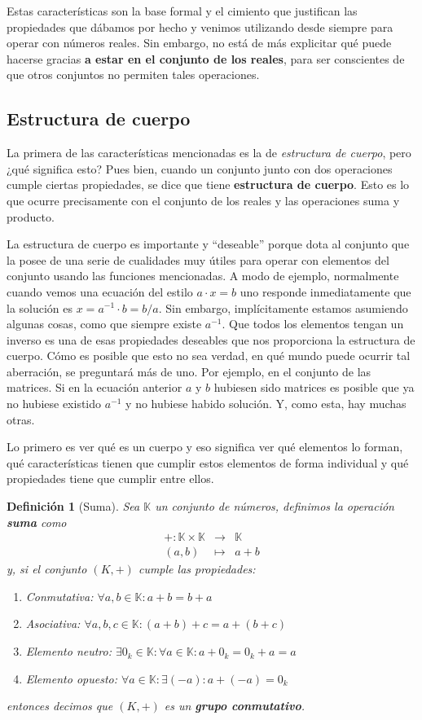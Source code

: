\documentclass[10pt,a4paper,openright]{book}
\theoremstyle{break}
\newtheorem{defi}{Definición}[chapter]
\begin{document}
Estas características son la base formal y el cimiento que justifican las propiedades que dábamos por hecho y venimos utilizando desde siempre para operar con números reales. Sin embargo, no está de más explicitar qué puede hacerse gracias \textbf{a estar en el conjunto de los reales}, para ser conscientes de que otros conjuntos no permiten tales operaciones.

\subsection{Estructura de cuerpo}
La primera de las características mencionadas es la de \textit{estructura de cuerpo}, pero ¿qué significa esto? Pues bien, cuando un conjunto junto con dos operaciones cumple ciertas propiedades, se dice que tiene \textbf{estructura de cuerpo}. Esto es lo que ocurre precisamente con el conjunto de los reales y las operaciones suma y producto.

La estructura de cuerpo es importante y ``deseable'' porque dota al conjunto que la posee de una serie de cualidades muy útiles para operar con elementos del conjunto usando las funciones mencionadas. A modo de ejemplo, normalmente cuando vemos una ecuación del estilo $a\cdot x = b$ uno responde inmediatamente que la solución es $x = a^{-1}\cdot b = b/a$. Sin embargo, implícitamente estamos asumiendo algunas cosas, como que siempre existe $a^{-1}$. Que todos los elementos tengan un inverso es una de esas propiedades deseables que nos proporciona la estructura de cuerpo. Cómo es posible que esto no sea verdad, en qué mundo puede ocurrir tal aberración, se preguntará más de uno. Por ejemplo, en el conjunto de las matrices. Si en la ecuación anterior $a$ y $b$ hubiesen sido matrices es posible que ya no hubiese existido $a^{-1}$ y no hubiese habido solución. Y, como esta, hay muchas otras.

Lo primero es ver qué es un cuerpo y eso significa ver qué elementos lo forman, qué características tienen que cumplir estos elementos de forma individual y qué propiedades tiene que cumplir entre ellos.

\begin{defi}[Suma]
Sea $\mathbb K$ un conjunto de números, definimos la operación \textbf{suma} como
\begin{eqnarray*}
+: \mathbb K \times\mathbb K & \longrightarrow & \mathbb K \\
(a,b) & \longmapsto  & a+b
\end{eqnarray*}
y, si el conjunto $(K, +)$ cumple las propiedades:
\begin{enumerate}
\item Conmutativa: $\forall a, b \in \mathbb K: a+b=b+a$
\item Asociativa: $\forall a, b, c\in \mathbb K : (a+b)+c=a+(b+c)$
\item Elemento neutro: $\exists 0_k\in \mathbb K : \forall a \in \mathbb K : a+0_k=0_k+a=a$
\item Elemento opuesto: $\forall a \in \mathbb K : \exists (-a) : a+(-a)=0_k$
\end{enumerate}
entonces decimos que $(K,+)$ es un \textbf{grupo conmutativo}.
\end{defi}
\end{document}
